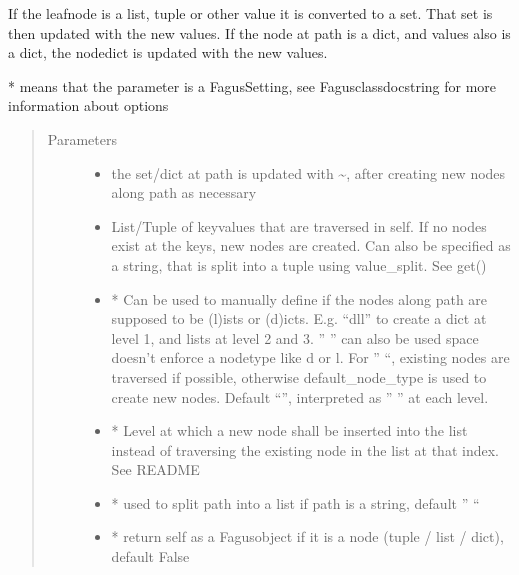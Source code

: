 \documentclass[a4paper,10pt,english]{sphinxmanual}
\begin{document}
\begin{fulllineitems}
\begin{fulllineitems}
\sphinxAtStartPar
If the leaf\sphinxhyphen{}node is a list, tuple or other value it is converted to a set. That set is then updated with the new
values. If the node at path is a dict, and values also is a dict, the node\sphinxhyphen{}dict is updated with the new values.

\sphinxAtStartPar
* means that the parameter is a Fagus\sphinxhyphen{}Setting, see Fagus\sphinxhyphen{}class\sphinxhyphen{}docstring for more information about options
\begin{quote}\begin{description}
\item[{Parameters}] \leavevmode\begin{itemize}
\item {}
\sphinxAtStartPar
{} \textendash{} the set/dict at path is updated with \textasciitilde{}, after creating new nodes along path as necessary

\item {}
\sphinxAtStartPar
{} \textendash{} List/Tuple of key\sphinxhyphen{}values that are traversed in self. If no nodes exist at the keys, new nodes are
created. Can also be specified as a string, that is split into a tuple using value\_split. See get()

\item {}
\sphinxAtStartPar
{} \textendash{} * Can be used to manually define if the nodes along path are supposed to be (l)ists or
(d)icts. E.g. “dll” to create a dict at level 1, and lists at level 2 and 3. ” ” can also be used \sphinxhyphen{}
space doesn’t enforce a node\sphinxhyphen{}type like d or l. For ” “, existing nodes are traversed if possible,
otherwise default\_node\_type is used to create new nodes. Default “”, interpreted as ” ” at each level.

\item {}
\sphinxAtStartPar
{} \textendash{} * Level at which a new node shall be inserted into the list instead of traversing the
existing node in the list at that index. See README

\item {}
\sphinxAtStartPar
{} \textendash{} * used to split path into a list if path is a string, default ” “

\item {}
\sphinxAtStartPar
{} \textendash{} * return self as a Fagus\sphinxhyphen{}object if it is a node (tuple / list / dict), default False


\end{itemize}
\end{description}
\end{quote}
\end{fulllineitems}
\end{fulllineitems}
\end{document}
